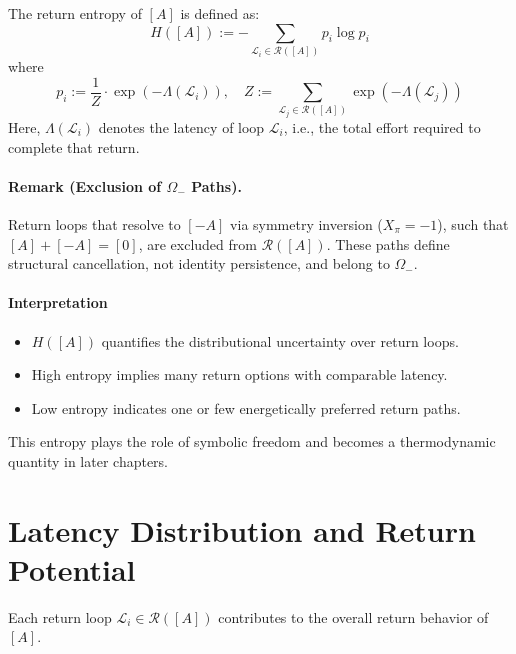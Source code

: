 \begin{definition} \label{def:return-entropy}
The return entropy of $[A]$ is defined as:
\begin{equation} \label{eq:return-entropy}
H([A]) := -\sum_{\mathcal{L}_i \in \mathcal{R}([A])} p_i \log p_i
\end{equation}
where
\begin{equation} \label{eq:return-entropy-probs}
p_i := \frac{1}{Z} \cdot \exp(-\Lambda(\mathcal{L}_i)), \quad
Z := \sum_{\mathcal{L}_j \in \mathcal{R}([A])} \exp(-\Lambda(\mathcal{L}_j))
\end{equation}
Here, $\Lambda(\mathcal{L}_i)$ denotes the latency of loop $\mathcal{L}_i$, i.e., the total effort required to complete that return.
\end{definition}

\paragraph{Remark (Exclusion of $\Omega_-$ Paths).}
Return loops that resolve to $[-A]$ via symmetry inversion ($X_\pi = -1$), such that $[A] + [-A] = [0]$, are excluded from $\mathcal{R}([A])$. These paths define structural cancellation, not identity persistence, and belong to $\Omega_-$.

\paragraph{Interpretation}
\begin{itemize}
    \item $H([A])$ quantifies the distributional uncertainty over return loops.
    \item High entropy implies many return options with comparable latency.
    \item Low entropy indicates one or few energetically preferred return paths.
\end{itemize}
This entropy plays the role of symbolic freedom and becomes a thermodynamic quantity in later chapters.

\section{Latency Distribution and Return Potential} \label{latency-distribution-and-return-potential}

Each return loop $\mathcal{L}_i \in \mathcal{R}([A])$ contributes to the overall return behavior of $[A]$.

